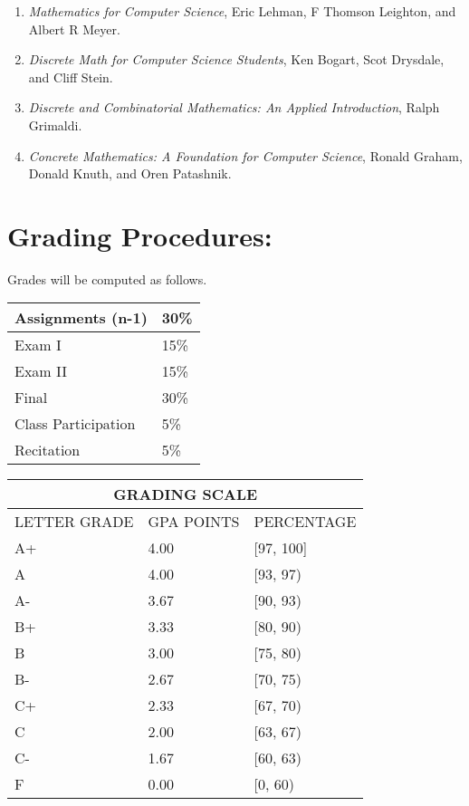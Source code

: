 \documentclass[a4paper]{article}
\begin{document}
\begin{enumerate}
\item {\it Mathematics for Computer Science}, Eric Lehman, F Thomson Leighton, and Albert R Meyer.
\item {\it Discrete Math for Computer Science Students}, Ken Bogart, Scot Drysdale, and Cliff Stein.
\item {\it Discrete and Combinatorial Mathematics: An Applied Introduction}, Ralph Grimaldi.
\item {\it Concrete Mathematics: A Foundation for Computer Science}, Ronald Graham, Donald Knuth, and Oren Patashnik.
\end{enumerate}

\section{Grading Procedures:}
\label{sec:grade}

Grades will be computed as follows.\\
\begin{tabular}{|l|l|}
\hline
Assignments (n-1) &	30\%\\\hline
Exam I & 	15\%\\\hline
Exam II & 	15\%\\\hline
Final & 	30\%\\\hline
Class Participation & 	5\%\\\hline
Recitation & 	5\%\\\hline
\end{tabular}
\begin{tabular}{|l|l|l|}
  \hline
  \multicolumn{3}{|c|}{\bf GRADING SCALE}\\\hline
  LETTER GRADE & GPA POINTS & PERCENTAGE\\\hline
  A+ & 4.00 & [97, 100] \\\hline
  A & 4.00 & [93, 97) \\\hline
  A- & 3.67 & [90, 93) \\\hline
  B+ & 3.33 & [80, 90) \\\hline
  B & 3.00 & [75, 80) \\\hline
  B- & 2.67 & [70, 75) \\\hline
  C+ & 2.33 & [67, 70) \\\hline
  C & 2.00 & [63, 67) \\\hline
  C- & 1.67 & [60, 63) \\\hline
  F & 0.00 & [0, 60)\\\hline
\end{tabular}
\end{document}
